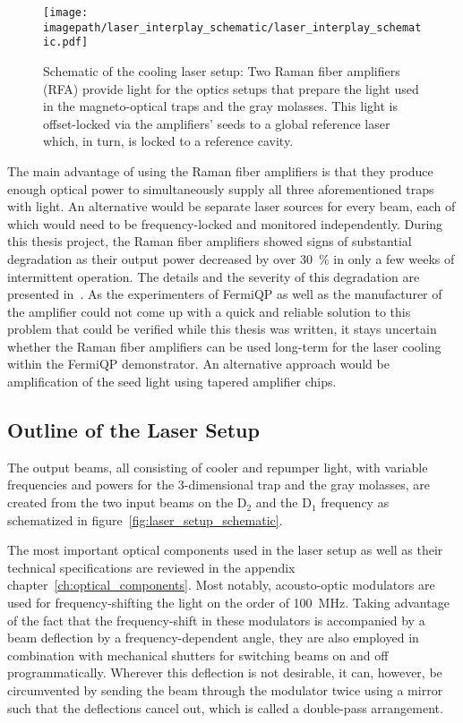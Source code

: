 \begin{figure}
    \centering
    \texttt{[image: \\imagepath/laser\_interplay\_schematic/laser\_interplay\_schematic.pdf]}
    \caption{Schematic of the cooling laser setup: Two Raman fiber amplifiers  (RFA) provide light for the optics setups that prepare the light used in the magneto-optical traps and the gray molasses. This light is offset-locked via the amplifiers' seeds to a global reference laser which, in turn, is locked to a reference cavity.}
    \label{fig:laser_interplay_schematic}
\end{figure}

The main advantage of using the Raman fiber amplifiers is that they produce enough optical power to simultaneously supply all three aforementioned traps with light. An alternative would be separate laser sources for every beam, each of which would need to be frequency-locked and monitored independently. During this thesis project, the Raman fiber amplifiers showed signs of substantial degradation as their output power decreased by over \SI{30}{\percent} in only a few weeks of intermittent operation. The details and the severity of this degradation are presented in~\cite{qesja_notitle_2022}. As the experimenters of FermiQP as well as the manufacturer of the amplifier could not come up with a quick and reliable solution to this problem that could be verified while this thesis was written, it stays uncertain whether the Raman fiber amplifiers can be used long-term for the laser cooling within the FermiQP demonstrator. An alternative approach would be amplification of the seed light using tapered amplifier chips.

\subsection*{Outline of the Laser Setup}
The output beams, all consisting of cooler and repumper light, with variable frequencies and powers for the 3-dimensional trap and the gray molasses, are created from the two input beams on the D$_2$ and the D$_1$ frequency as schematized in figure~\ref{fig:laser_setup_schematic}.

The most important optical components used in the laser setup as well as their technical specifications are reviewed in the appendix chapter~\ref{ch:optical_components}. Most notably, acousto-optic modulators are used for frequency-shifting the light on the order of \SI{100}{\mega\hertz}. Taking advantage of the fact that the frequency-shift in these modulators is accompanied by a beam deflection by a frequency-dependent angle, they are also employed in combination with mechanical shutters for switching beams on and off programmatically. Wherever this deflection is not desirable, it can, however, be circumvented by sending the beam through the modulator twice using a mirror such that the deflections cancel out, which is called a double-pass arrangement.

